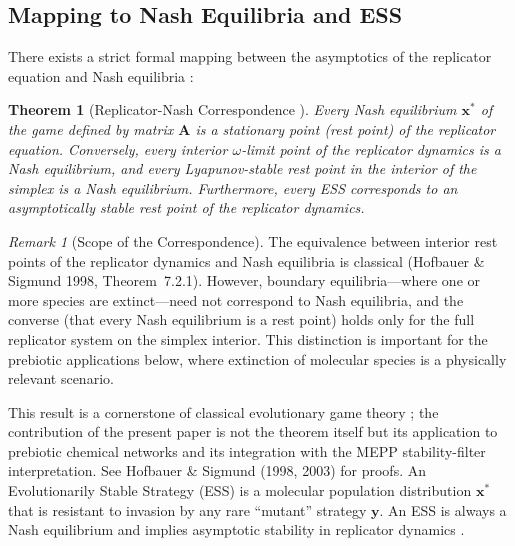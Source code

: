 \documentclass[12pt,a4paper]{article}
\newtheorem{theorem}{Theorem}
\theoremstyle{remark}
\newtheorem{remark}{Remark}
\begin{document}
\subsection{Mapping to Nash Equilibria and ESS}

There exists a strict formal mapping between the asymptotics of the replicator equation and Nash equilibria \citep{HofbauerSigmund1998,HofbauerSigmund2003}:

\begin{theorem}[Replicator-Nash Correspondence {\citep{HofbauerSigmund2003,HofbauerSigmund1998}}]
\label{thm:replicator-nash}
Every Nash equilibrium $\mathbf{x}^*$ of the game defined by matrix $\mathbf{A}$ is a stationary point (rest point) of the replicator equation. Conversely, every interior $\omega$-limit point of the replicator dynamics is a Nash equilibrium, and every Lyapunov-stable rest point in the interior of the simplex is a Nash equilibrium. Furthermore, every ESS corresponds to an asymptotically stable rest point of the replicator dynamics.
\end{theorem}

\begin{remark}[Scope of the Correspondence]
The equivalence between interior rest points of the replicator dynamics and Nash equilibria is classical (Hofbauer \& Sigmund 1998, Theorem~7.2.1). However, boundary equilibria---where one or more species are extinct---need not correspond to Nash equilibria, and the converse (that every Nash equilibrium is a rest point) holds only for the full replicator system on the simplex interior. This distinction is important for the prebiotic applications below, where extinction of molecular species is a physically relevant scenario.
\end{remark}

This result is a cornerstone of classical evolutionary game theory \citep{Weibull1995}; the contribution of the present paper is not the theorem itself but its application to prebiotic chemical networks and its integration with the MEPP stability-filter interpretation. See Hofbauer \& Sigmund (1998, 2003) for proofs. An Evolutionarily Stable Strategy (ESS) is a molecular population distribution $\mathbf{x}^*$ that is resistant to invasion by any rare ``mutant'' strategy $\mathbf{y}$. An ESS is always a Nash equilibrium and implies asymptotic stability in replicator dynamics \citep{HofbauerSigmund1998}.
\end{document}
